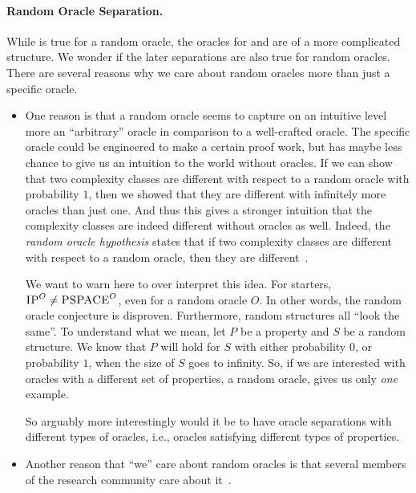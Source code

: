\documentclass{article}
\begin{document}
\paragraph{Random Oracle Separation.}
    While  is true for a random oracle,
    the oracles for  and  are of a more complicated structure. 
    We wonder if the later separations are also true for random oracles.
    There are several reasons why we care about random oracles more than just a specific oracle.
    \begin{itemize}
        \item One reason is that a random oracle seems to capture on an intuitive level more an ``arbitrary'' oracle in comparison to a well-crafted oracle.
        The specific oracle could be engineered to make a certain proof work, but has maybe less chance to give us an intuition to the world without oracles.
        If we can show that two complexity classes are different with respect to a random oracle with probability $1$,
        then we showed that they are different with infinitely more oracles than just one.
        And thus this gives a stronger intuition that the complexity classes are indeed different without oracles as well.
        Indeed, the \textit{random oracle hypothesis} states that if two complexity classes are different with respect to a random oracle, then they are different~\cite{bennett1981relative}.

        We want to warn here to over interpret this idea.
        For starters, $\textsc{IP}^O \neq \textsc{PSPACE}^O$, even for a random oracle $O$.
        In other words, the random oracle conjecture is disproven.
        Furthermore, random structures all ``look the same''.
        To understand what we mean, let $P$ be a property and $S$ be a random structure. 
        We know that $P$ will hold for $S$ with either probability $0$, or probability $1$, when the size of $S$ goes to infinity.
        So, if we are interested with oracles with a different set of properties, a random oracle, gives us only \textit{one} example.

        So arguably more interestingly would it be to have oracle separations with different types of oracles, i.e., oracles satisfying different types of properties.
        
        \item Another reason that ``we'' care about random oracles is that several members of the research community care about it~\cite{barak_ac0_notes, hastad1986, rossman2015}.
    \end{itemize}
 
\end{document}
